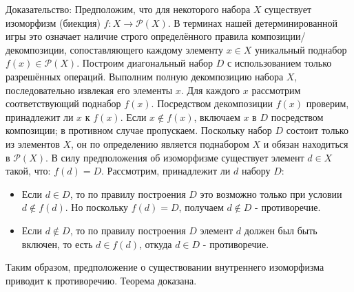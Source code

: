 \documentclass[12pt]{article}
\begin{document}
Доказательство:
Предположим, что для некоторого набора $X$ существует изоморфизм (биекция) $f : X \to \mathcal{P}(X)$. В терминах нашей детерминированной игры это означает наличие строго определённого правила композиции/декомпозиции, сопоставляющего каждому элементу $x \in X$ уникальный поднабор $f(x) \in \mathcal{P}(X)$. Построим диагональный набор $D$ с использованием только разрешённых операций. Выполним полную декомпозицию набора $X$, последовательно извлекая его элементы $x$. Для каждого $x$ рассмотрим соответствующий поднабор $f(x)$. Посредством декомпозиции $f(x)$ проверим, принадлежит ли $x$ к $f(x)$. Если $x \notin f(x)$, включаем $x$ в $D$ посредством композиции; в противном случае пропускаем. Поскольку набор $D$ состоит только из элементов $X$, он по определению является поднабором $X$ и обязан находиться в $\mathcal{P}(X)$. В силу предположения об изоморфизме существует элемент $d \in X$ такой, что: $f(d) = D$. Рассмотрим, принадлежит ли $d$ набору $D$:
 \begin{itemize}
	\item Если $d \in D$, то по правилу построения $D$ это возможно только при условии $d \notin f(d)$. Но поскольку $f(d) = D$, получаем $d \notin D$ - противоречие.
	\item Если $d \notin D$, то по правилу построения $D$ элемент $d$ должен был быть включен, то есть $d \in f(d)$, откуда $d \in D$ - противоречие.
\end{itemize}

Таким образом, предположение о существовании внутреннего изоморфизма приводит к противоречию. Теорема доказана.
\end{document}
